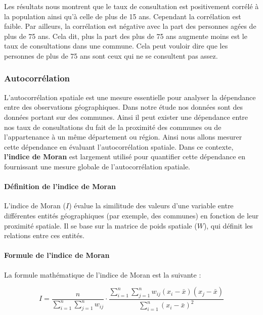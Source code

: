 \documentclass[
]{article}
\begin{document}
Les résultats nous montrent que le taux de consultation est positivement
corrélé à la population ainsi qu'à celle de plus de 15 ans. Cependant la
corrélation est faible. Par ailleurs, la corrélation est négative avec
la part des personnes agées de plus de 75 ans. Cela dit, plus la part
des plus de 75 ans augmente moins est le taux de consultations dans une
commune. Cela peut vouloir dire que les personnes de plus de 75 ans sont
ceux qui ne se consultent pas assez.

\hypertarget{autocorruxe9lation}{%
\subsubsection{Autocorrélation}\label{autocorruxe9lation}}

L'autocorrélation spatiale est une mesure essentielle pour analyser la
dépendance entre des observations géographiques. Dans notre étude nos
données sont des données portant sur des communes. Ainsi il peut exister
une dépendance entre nos taux de consultations du fait de la proximité
des communes ou de l'appartenance à un même département ou région. Ainsi
nous allons mesurer cette dépendance en évaluant l'autocorrélation
spatiale. Dans ce contexte, \textbf{l'indice de Moran} est largement
utilisé pour quantifier cette dépendance en fournissant une mesure
globale de l'autocorrélation spatiale.

\hypertarget{duxe9finition-de-lindice-de-moran}{%
\paragraph{Définition de l'indice de
Moran}\label{duxe9finition-de-lindice-de-moran}}

L'indice de Moran (\(I\)) évalue la similitude des valeurs d'une
variable entre différentes entités géographiques (par exemple, des
communes) en fonction de leur proximité spatiale. Il se base sur la
matrice de poids spatiale (\(W\)), qui définit les relations entre ces
entités.

\hypertarget{formule-de-lindice-de-moran}{%
\paragraph{Formule de l'indice de
Moran}\label{formule-de-lindice-de-moran}}

La formule mathématique de l'indice de Moran est la suivante :

\[
I = \frac{n}{\sum_{i=1}^n \sum_{j=1}^n w_{ij}} \cdot \frac{\sum_{i=1}^n \sum_{j=1}^n w_{ij} (x_i - \bar{x})(x_j - \bar{x})}{\sum_{i=1}^n (x_i - \bar{x})^2}
\]
\end{document}
